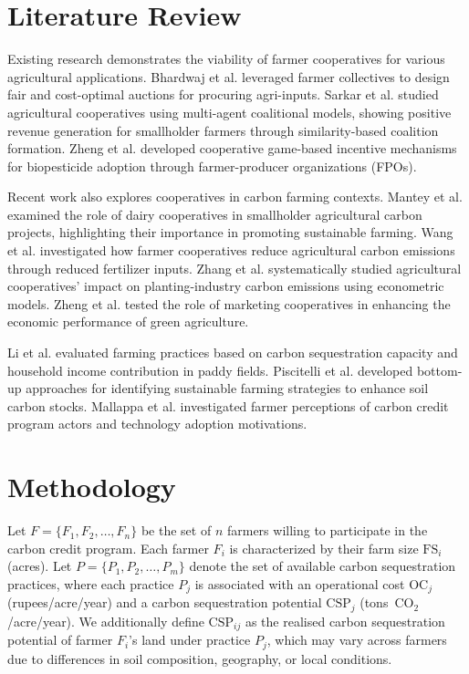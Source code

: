 \documentclass[manuscript, screen]{acmart}
\begin{document}
\section{Literature Review}
Existing research demonstrates the viability of farmer cooperatives for various agricultural applications. Bhardwaj et al. \cite{bhardwaj2023designing} leveraged farmer collectives to design fair and cost-optimal auctions for procuring agri-inputs. Sarkar et al. \cite{sarkar2023coalition} studied agricultural cooperatives using multi-agent coalitional models, showing positive revenue generation for smallholder farmers through similarity-based coalition formation. Zheng et al. \cite{zheng2022cooperative} developed cooperative game-based incentive mechanisms for biopesticide adoption through farmer-producer organizations (FPOs).

Recent work also explores cooperatives in carbon farming contexts. Mantey et al. \cite{mantey2025carbon} examined the role of dairy cooperatives in smallholder agricultural carbon projects, highlighting their importance in promoting sustainable farming. Wang et al. \cite{wang2024effects} investigated how farmer cooperatives reduce agricultural carbon emissions through reduced fertilizer inputs. Zhang et al. \cite{zhang2025can} systematically studied agricultural cooperatives’ impact on planting-industry carbon emissions using econometric models. Zheng et al. \cite{zheng2023economic} tested the role of marketing cooperatives in enhancing the economic performance of green agriculture.

Li et al. \cite{li2013carbon} evaluated farming practices based on carbon sequestration capacity and household income contribution in paddy fields. Piscitelli et al. \cite{piscitelli2023carbon} developed bottom-up approaches for identifying sustainable farming strategies to enhance soil carbon stocks. Mallappa et al. \cite{MALLAPPA2025100317} investigated farmer perceptions of carbon credit program actors and technology adoption motivations.

\section{Methodology}

Let $F = \{F_1, F_2, \ldots, F_n\}$ be the set of $n$ farmers willing to
participate in the carbon credit program. Each farmer $F_i$ is characterized
by their farm size $\text{FS}_i$ (acres). Let $P = \{P_1, P_2, \ldots, P_m\}$
denote the set of available carbon sequestration practices, where each practice
$P_j$ is associated with an operational cost $\text{OC}_j$ (rupees/acre/year)
and a carbon sequestration potential $\text{CSP}_j$ (tons~CO$_2$/acre/year).
We additionally define $\text{CSP}_{ij}$ as the realised carbon sequestration
potential of farmer $F_i$'s land under practice $P_j$, which may vary across
farmers due to differences in soil composition, geography, or local conditions.
\end{document}
